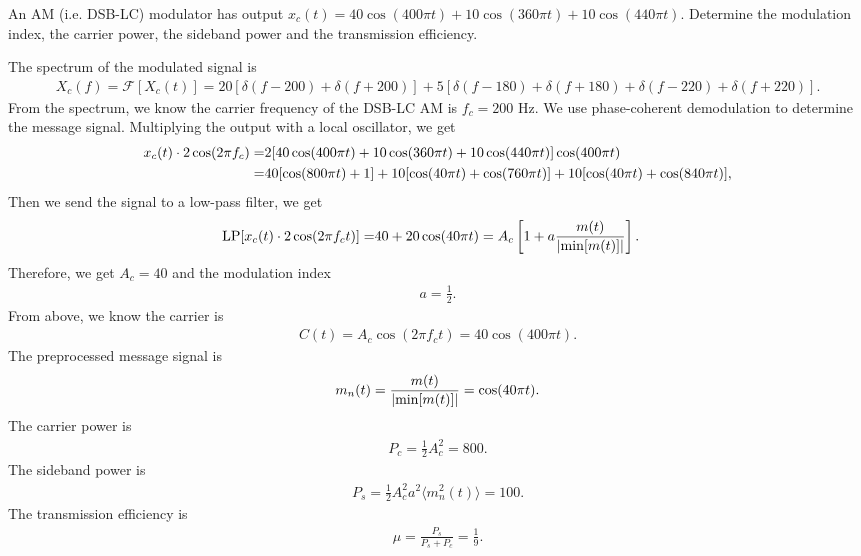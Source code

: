 \documentclass{assignment}
\begin{document}
\begin{prob}
    An AM (i.e. DSB-LC) modulator has output $x_c(t)=40\cos(400\pi t)+10\cos(360\pi t)+10\cos(440\pi t)$. Determine the modulation index, the carrier power, the sideband power and the transmission efficiency.
\end{prob}
\begin{sol}
    The spectrum of the modulated signal is
    \begin{align}
        X_c(f)=\mathscr{F}[X_c(t)]=20[\delta(f-200)+\delta(f+200)]+5[\delta(f-180)+\delta(f+180)+\delta(f-220)+\delta(f+220)].
    \end{align}
    From the spectrum, we know the carrier frequency of the DSB-LC AM is $f_c=200$ Hz.
    We use phase-coherent demodulation to determine the message signal. Multiplying the output with a local oscillator, we get
    \begin{align}
        \notag x_c(t)\cdot 2\cos(2\pi f_c)=&2[40\cos(400\pi t)+10\cos(360\pi t)+10\cos(440\pi t)]\cos(400\pi t)\\
        =&40[\cos(800\pi t)+1]+10[\cos(40\pi t)+\cos(760\pi t)]+10[\cos(40\pi t)+\cos(840\pi t)],
    \end{align}
    Then we send the signal to a low-pass filter, we get
    \begin{align}
        \text{LP}[x_c(t)\cdot 2\cos(2\pi f_ct)]=&40+20\cos(40\pi t)=A_c\left[1+a\frac{m(t)}{\left\lvert\min[m(t)]\right\rvert}\right].
    \end{align}
    Therefore, we get $A_c=40$ and the modulation index
    \begin{align}
        a=\frac{1}{2}.
    \end{align}
    From above, we know the carrier is
    \begin{align}
        C(t)=A_c\cos(2\pi f_ct)=40\cos(400\pi t).
    \end{align}
    The preprocessed message signal is
    \begin{align}
        m_n(t)=\frac{m(t)}{\left\lvert\min[m(t)]\right\rvert}=\cos(40\pi t).
    \end{align}
    The carrier power is
    \begin{align}
        P_c=\frac{1}{2}A_c^2=800.
    \end{align}
    The sideband power is
    \begin{align}
        P_s=\frac{1}{2}A_c^2a^2\langle m_n^2(t)\rangle=100.
    \end{align}
    The transmission efficiency is
    \begin{align}
        \mu=\frac{P_s}{P_s+P_c}=\frac{1}{9}.
    \end{align}
\end{sol}
\end{document}
